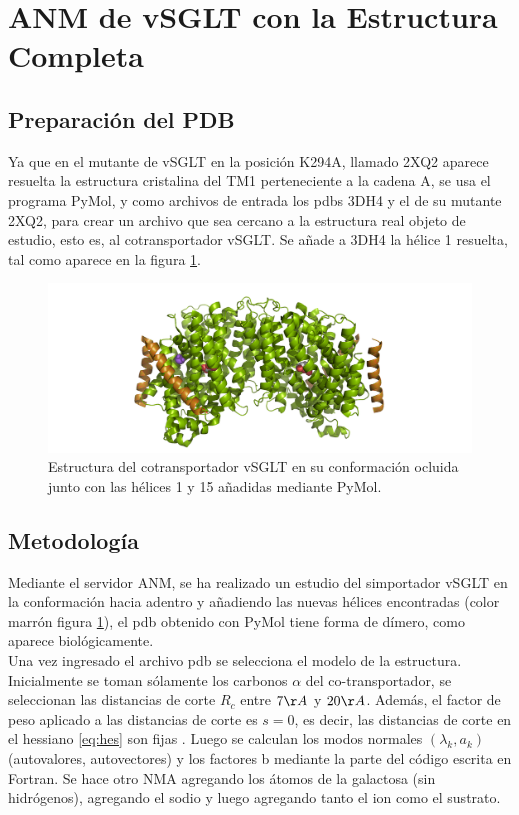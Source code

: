 \section{ANM de vSGLT con la Estructura Completa}
\subsection{Preparaci\'{o}n del PDB}
Ya que en el mutante de vSGLT en la posici\'{o}n K294A, llamado 2XQ2 aparece resuelta la estructura cristalina del TM1 perteneciente a la cadena A, se usa el programa PyMol, y como archivos de entrada los pdbs 3DH4 y el de su mutante 2XQ2, para crear un archivo que sea cercano a la estructura real objeto de estudio, esto es, al cotransportador vSGLT. Se a\~{n}ade a 3DH4 la h\'{e}lice 1 resuelta, tal como aparece en la figura \ref{fig:vSGLT_in_2}.\\
\begin{figure}[h]
 \centering
 \includegraphics[scale=0.3]{Kap4/vSGLT_n.png}
 \caption{Estructura del cotransportador vSGLT en su conformaci\'{o}n ocluida junto con las h\'{e}lices 1 y 15 a\~{n}adidas mediante PyMol.}
 \label{fig:vSGLT_in_2}
\end{figure}
\subsection{Metodolog\'{i}a}
Mediante el servidor ANM, se ha realizado un estudio del simportador vSGLT en la conformaci\'{o}n hacia adentro y a\~{n}adiendo las nuevas h\'{e}lices encontradas (color marr\'{o}n figura \ref{fig:vSGLT_in_2}), el pdb obtenido con PyMol tiene forma de d\'{i}mero, como aparece biol\'{o}gicamente. \\

Una vez ingresado el archivo pdb se selecciona el modelo de la estructura. Inicialmente se toman s\'{o}lamente los carbonos $\alpha$ del co-transportador, se seleccionan las distancias de corte $R_c$ entre $7\AA$ y $20\AA$. Adem\'{a}s, el factor de peso aplicado a las distancias de corte es $s=0$, es decir, las distancias de corte en el hessiano \eqref{eq:hes} son fijas \cite{Zimmermann2011}. Luego se calculan los modos normales $(\lambda_k,a_k)$ (autovalores, autovectores) y los factores b mediante la parte del c\'{o}digo escrita en Fortran. Se hace otro NMA agregando los \'{a}tomos de la galactosa (sin hidr\'{o}genos), agregando el sodio y luego agregando tanto el ion como el sustrato.\\
